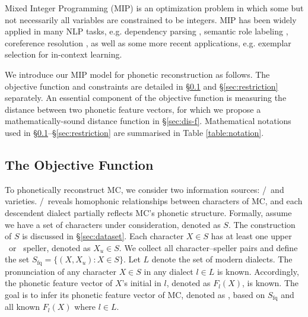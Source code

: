 Mixed Integer Programming (MIP) is an optimization problem in which some but not necessarily all variables are constrained to be integers.
MIP has been widely applied in many NLP tasks, e.g. dependency parsing \citep{riedel-clarke-2006-ILP-parsing}, semantic role labeling \citep{ILP-semantic-role}, coreference resolution \citep{de-belder-moens-2012-coreference}, as well as some more recent applications, e.g. exemplar selection for in-context learning. \citep{tonglet-etal-2023-seer}

We introduce our MIP model for phonetic reconstruction as follows. 
The objective function and constraints are detailed in \S\ref{sec:obj} and \S\ref{sec:restriction} separately. 
An essential component of the objective function is measuring the distance between two phonetic feature vectors, for which we propose a mathematically-sound distance function in \S\ref{sec:dis-f}.
Mathematical notations used in \S\ref{sec:obj}--\S\ref{sec:restriction} are summarised in Table \ref{table:notation}.

\subsection{The Objective Function} \label{sec:obj}

To phonetically reconstruct MC, we consider two information sources: \fq/\zhiyin~and varieties. 
\fq/\zhiyin~reveals homophonic relationships between characters of MC, 
and each descendent dialect partially reflects MC's phonetic structure. 
Formally, assume we have a set of characters under consideration, denoted as $S$. 
The construction of $S$ is discussed in \S\ref{sec:dataset}.
Each character $X\in S$ has at least one upper \fq~or \zhiyin~speller, denoted as $X_{u}\in S$. 
We collect all character--speller pairs and define the set $S_{\text{fq}}=\{(X, X_{u}): X \in S\}$.
Let $L$ denote the set of modern dialects.
The pronunciation of any character $X\in S$ in any dialect $l\in L$ is known.
Accordingly, the phonetic feature vector of $X$'s initial in $l$, denoted as $F_l(X)$, is known.
The goal is to infer its phonetic feature vector of MC, denoted as \fmc, based on $S_{\text{fq}}$ and all known $F_{l}(X)$ where $l\in L$.

